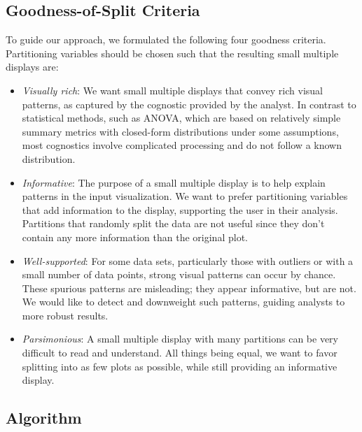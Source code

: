 \subsection{Goodness-of-Split Criteria}
To guide our approach, we formulated the following four goodness criteria. Partitioning variables should be chosen such that the resulting small multiple displays are:
\begin{itemize}
\item \emph{Visually rich}: We want small multiple displays that convey rich visual patterns, as captured by the cognostic provided by the analyst. In contrast to statistical methods, such as ANOVA, which are based on relatively simple summary metrics with closed-form distributions under some assumptions, most cognostics involve complicated processing and do not follow a known distribution.

\item \emph{Informative}: The purpose of a small multiple display is to help explain patterns in the input visualization. We want to prefer partitioning variables that add information to the display, supporting the user in their analysis. Partitions that randomly split the data are not useful since they don't contain any more information than the original plot.

\item \emph{Well-supported}: For some data sets, particularly those with outliers or with a small number of data points, strong visual patterns can occur by chance. These spurious patterns are misleading; they appear informative, but are not. We would like to detect and downweight such  patterns, guiding analysts to more robust results.

\item \emph{Parsimonious}: A small multiple display with many partitions can be very difficult to read and understand. All things being equal, we want to favor splitting into as few plots as possible, while still providing an informative display.
\end{itemize}

\subsection{Algorithm}

